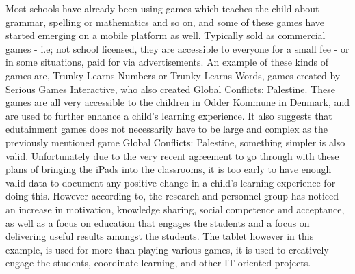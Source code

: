 Most schools have already been using games which teaches the child about grammar, spelling or mathematics and so on, and some of these games have 
started emerging on a mobile platform as well. Typically sold as commercial games - i.e; not school licensed, they are accessible to everyone for a 
small fee - or in some situations, paid for via advertisements. An example of these kinds of games are, Trunky Learns Numbers or Trunky Learns Words, 
games created by Serious Games Interactive, who also created Global Conflicts: Palestine. These games are all very accessible to the children in Odder 
Kommune in Denmark, and are used to further enhance a child's learning experience\cite{odderipad}. It also suggests that edutainment games does not 
necessarily have to be large and complex as the previously mentioned game Global Conflicts: Palestine, something simpler is also valid. Unfortunately 
due to the very recent agreement to go through with these plans of bringing the iPads into the classrooms, it is too early to have enough valid data to 
document any positive change in a child's learning experience for doing this. However according to\cite{odderipadpjece}, the research and personnel 
group has noticed an increase in motivation, knowledge sharing, social competence and acceptance, as well as a focus on education that engages the 
students and a focus on delivering useful results amongst the students. The tablet however in this example, is used for more than playing various 
games, it is used to creatively engage the students, coordinate learning, and other IT oriented projects\cite{odderipadpjece}.